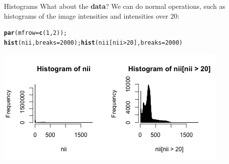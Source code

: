 \documentclass[11pt]{beamer}\usepackage[]{graphicx}\usepackage[]{color}
\makeatletter
\newcommand{\hlnum}[1]{\textcolor[rgb]{0.686,0.059,0.569}{#1}}%
\newcommand{\hlopt}[1]{\textcolor[rgb]{0,0,0}{#1}}%
\newcommand{\hlstd}[1]{\textcolor[rgb]{0.345,0.345,0.345}{#1}}%
\newcommand{\hlkwc}[1]{\textcolor[rgb]{0.333,0.667,0.333}{#1}}%
\newcommand{\hlkwd}[1]{\textcolor[rgb]{0.737,0.353,0.396}{\textbf{#1}}}%
\newenvironment{kframe}{%
 \def\at@end@of@kframe{}%
 \ifinner\ifhmode%
  \def\at@end@of@kframe{\end{minipage}}%
  \begin{minipage}{\columnwidth}%
 \fi\fi%
 \def\FrameCommand##1{\hskip\@totalleftmargin \hskip-\fboxsep
 \colorbox{shadecolor}{##1}\hskip-\fboxsep
     \hskip-\linewidth \hskip-\@totalleftmargin \hskip\columnwidth}%
 \MakeFramed {\advance\hsize-\width
   \@totalleftmargin\z@ \linewidth\hsize
   \@setminipage}}%
 {\par\unskip\endMakeFramed%
 \at@end@of@kframe}
\newenvironment{knitrout}{}{} %
\makeatother
\begin{document}
\begin{frame}[fragile]{Histograms}
What about the {\bf data}?  We can do normal operations, such as histograms of the image intensities and intensities over $20$:

\begin{center}
\begin{knitrout}
\color{fgcolor}\begin{kframe}
\begin{alltt}
\hlkwd{par}\hlstd{(}\hlkwc{mfrow}\hlstd{=}\hlkwd{c}\hlstd{(}\hlnum{1}\hlstd{,}\hlnum{2}\hlstd{));}
\hlkwd{hist}\hlstd{(nii,} \hlkwc{breaks} \hlstd{=} \hlnum{2000}\hlstd{);} \hlkwd{hist}\hlstd{(nii[nii} \hlopt{>} \hlnum{20}\hlstd{],} \hlkwc{breaks} \hlstd{=} \hlnum{2000}\hlstd{)}
\end{alltt}
\end{kframe}
\includegraphics[width=\textwidth,height=0.5\textheight,keepaspectratio]{figure/image_hist-1} 

\end{knitrout}
\end{center}

\end{frame}
\end{document}

